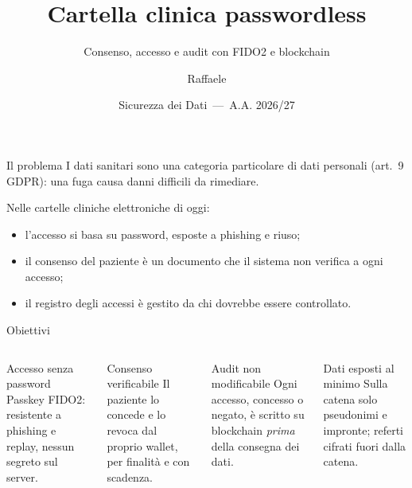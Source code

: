 \documentclass[11pt,aspectratio=169]{beamer}
\title{Cartella clinica passwordless}
\subtitle{Consenso, accesso e audit con FIDO2 e blockchain}
\author{Raffaele}
\institute{Laurea magistrale in Informatica, curriculum Sicurezza Informatica\\Università degli Studi di Salerno}
\date{Sicurezza dei Dati \,---\, A.A. 2026/27}
\begin{document}
\maketitle

\begin{frame}{Il problema}
I dati sanitari sono una \alert{categoria particolare} di dati personali (art.~9 GDPR): una fuga causa danni difficili da rimediare.

\bigskip
Nelle cartelle cliniche elettroniche di oggi:
\begin{itemize}
  \item l'accesso si basa su \alert{password}, esposte a phishing e riuso;
  \item il \alert{consenso} del paziente è un documento che il sistema non verifica a ogni accesso;
  \item il \alert{registro degli accessi} è gestito da chi dovrebbe essere controllato.
\end{itemize}
\end{frame}

\begin{frame}{Obiettivi}
\begin{columns}[T]
\begin{block}{Accesso senza password}
Passkey FIDO2: resistente a phishing e replay, nessun segreto sul server.
\end{block}
\begin{block}{Consenso verificabile}
Il paziente lo concede e lo revoca dal proprio wallet, per finalità e con scadenza.
\end{block}
\begin{block}{Audit non modificabile}
Ogni accesso, concesso o negato, è scritto su blockchain \emph{prima} della consegna dei dati.
\end{block}
\begin{block}{Dati esposti al minimo}
Sulla catena solo pseudonimi e impronte; referti cifrati fuori dalla catena.
\end{block}
\end{columns}
\end{frame}
\end{document}
